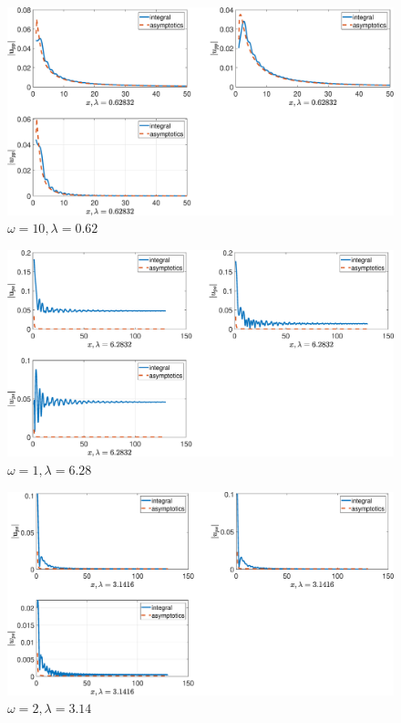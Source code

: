 \begin{figure}[!h]\centering\includegraphics[scale=0.38]{uppw10cp(1)1cp(2)2cs(1)0,3cs(20,5rho(1)1rho(2)2.eps}\caption{$ \omega = 10, \lambda=0.62$}\end{figure}

\begin{figure}[!h]\centering\includegraphics[scale=0.38]{upsw1cp(1)1cp(2)2cs(1)0,3cs(20,5rho(1)1rho(2)2.eps}\caption{$ \omega = 1, \lambda=6.28$}\end{figure}

\begin{figure}[!h]\centering\includegraphics[scale=0.38]{upsw2cp(1)1cp(2)2cs(1)0,3cs(20,5rho(1)1rho(2)2.eps}\caption{$ \omega = 2, \lambda=3.14$}\end{figure}

